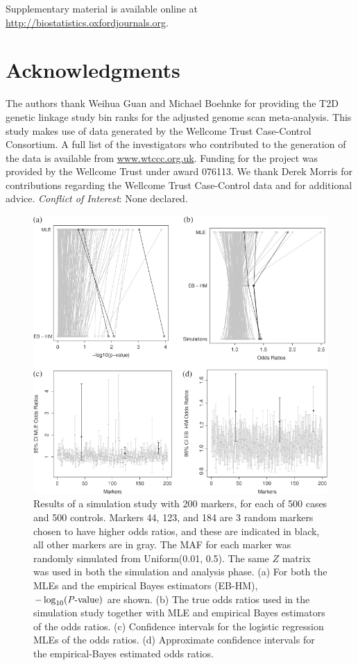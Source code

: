 \documentclass[oupdraft]{bio}
\begin{document}
Supplementary material is available online at
\href{http://biostatistics.oxfordjournals.org}%
{http://biostatistics.oxfordjournals.org}.


\section*{Acknowledgments}

The authors thank Weihua Guan and Michael Boehnke for providing
the T2D genetic linkage study bin ranks for the adjusted genome
scan meta-analysis. This study makes use of data generated by
the Wellcome Trust Case-Control Consortium. A full list of the
investigators who contributed to the generation of the data is
available from \href{www.wtccc.org.uk}{www.wtccc.org.uk}.
Funding for the project was provided by the Wellcome Trust
under award 076113. We thank Derek Morris for contributions
regarding the Wellcome Trust Case-Control data and for
additional advice.
{\it Conflict of Interest}: None declared.






\begin{figure}[!p]
\centering\includegraphics{fig1}
\caption{Results of a simulation study with 200 markers,
for each of 500 cases and 500 controls. Markers 44, 123,
and 184 are 3 random markers chosen to have higher odds
ratios, and these are indicated in black, all other markers
are in gray. The MAF for each marker was randomly simulated
from Uniform(0.01, 0.5). The same $Z$ matrix was used in both
the simulation and analysis phase. (a) For both the MLEs
and the empirical Bayes estimators (EB-HM),
$-\log_{10} (\hbox{\textit{P}-value})$ are shown.
(b) The true odds ratios used in the simulation study
together with MLE and empirical Bayes estimators of the odds
ratios. (c) Confidence intervals for the logistic regression
MLEs of the odds ratios. (d) Approximate confidence intervals
for the empirical-Bayes estimated odds ratios.}
\label{Fig1}
\end{figure}
\end{document}
